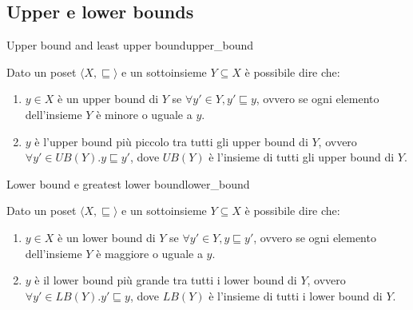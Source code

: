 \subsection{Upper e lower bounds}

\begin{definizione}{Upper bound and least upper bound}{upper_bound}

Dato un poset $\langle X, \sqsubseteq \rangle$ e un sottoinsieme $Y \subseteq X$
è possibile dire che:
\begin{enumerate}
    \item $y \in X$ è un upper bound di $Y$ se $\forall y' \in Y, y' \sqsubseteq y$,
    ovvero se ogni elemento dell'insieme $Y$ è minore o uguale a $y$.
    \item $y$ è l'upper bound più piccolo tra tutti gli upper bound di $Y$, ovvero
    $\forall y' \in UB(Y). y \sqsubseteq y'$, dove $UB(Y)$ è l'insieme di
    tutti gli upper bound di $Y$.
\end{enumerate}

\end{definizione}

\begin{definizione}{Lower bound e greatest lower bound}{lower_bound}

Dato un poset $\langle X, \sqsubseteq \rangle$ e un sottoinsieme $Y \subseteq X$
è possibile dire che:
\begin{enumerate}
    \item $y \in X$ è un lower bound di $Y$ se $\forall y' \in Y, y \sqsubseteq y'$,
    ovvero se ogni elemento dell'insieme $Y$ è maggiore o uguale a $y$.
    \item $y$ è il lower bound più grande tra tutti i lower bound di $Y$, ovvero
    $\forall y' \in LB(Y). y' \sqsubseteq y$, dove $LB(Y)$ è l'insieme di
    tutti i lower bound di $Y$.
\end{enumerate}

\end{definizione}

